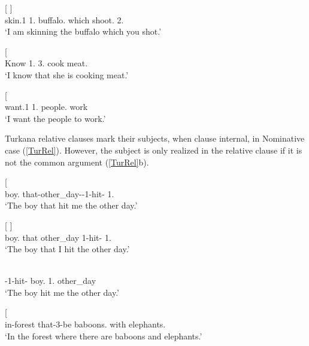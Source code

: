 \begin{exe}\ex\label{MurDep}
\begin{xlist}
\ex\gll{}    {\rm[}  \textbf{}{\rm]}\\
skin.1\sg{} 1\sg{}.\nom{} buffalo.\acc{} which shoot.\pst{} 2\sg{}.\nom{}\\
\glt `I am skinning the buffalo which you shot.'

\ex\gll{}   {\rm[}\textbf{}  \textipa{idiN}{\rm]}\\
Know 1\sg{}.\nom{} 3\sg{}.\acc{} cook meat.\acc{}\\
\glt `I know that she is cooking meat.'

\ex\gll{}   {\rm[}\textbf{} \textipa{kiliNliNit}{\rm]}\\
want.1\sg{} 1\sg{}.\nom{} people.\acc{} work\\
\glt `I want the people to work.'
\end{xlist}
\end{exe}
 

Turkana relative clauses mark their subjects, when clause internal, in Nominative  case (\ref{TurRel}).
However, the subject is only realized in the relative clause if it is not the common argument  (\ref{TurRel}b).

\begin{exe}\ex\label{TurRel}
\begin{xlist}
\ex\gll{}  {\rm[} \textipa{a-yON\`{}}{\rm]}\\
boy.\acc{} that-other\_day-\transitiv{}-1\sg{}-hit-\asp{} 1\sg{}.\acc{}\\
\glt `The boy that hit me the other day.'

\ex\gll{}  {\rm[}   \textbf{}{\rm]}\\
boy.\acc{} that other\_day 1\sg{}-hit-\asp{} 1\sg{}.\nom{}\\
\glt `The boy that I hit the other day.'

\ex\gll{}   \\
\transitiv{}-1\sg{}-hit-\asp{} boy.\nom{} 1\sg{}.\acc{} other\_day\\
\glt `The boy hit me the other day.'

\ex\gll{}  {\rm[}    \textipa{NI-tOm-E\`{}}{\rm]}\\
in-forest that-3-be baboons.\nom{} with elephants.\acc{}\\
\glt `In the forest where there are baboons and elephants.'  %
\end{xlist}
\end{exe}

